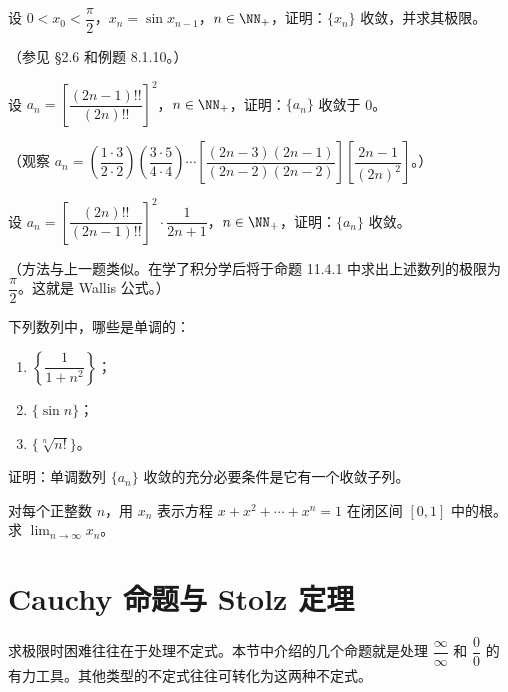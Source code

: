\begin{xexercise}[7]
设 $0<x_0<\dfrac\pi2$，$x_n=\sin x_{n-1}$，$n\in\NN_+$，证明：$\{x_n\}$ 收敛，并求其极限。

  （参见 §2.6 和例题 8.1.10。）
\end{xexercise}

\begin{xexercise}[8]
设 $a_n=\left[\dfrac{(2n-1)!!}{(2n)!!}\right]^2$，$n\in\NN_+$，证明：$\{a_n\}$ 收敛于 0。

  （观察 $a_n=\left(\dfrac{1\cdot3}{2\cdot2}\right)\left(\dfrac{3\cdot5}{4\cdot4}\right)\cdots\left[\dfrac{(2n-3)(2n-1)}{(2n-2)(2n-2)}\right]\left[\dfrac{2n-1}{(2n)^2}\right]$。）
\end{xexercise}

\begin{xexercise}[9]
设 $a_n=\left[\dfrac{(2n)!!}{(2n-1)!!}\right]^2\cdot\dfrac1{2n+1}$，$n\in\NN_+$，证明：$\{a_n\}$ 收敛。

  （方法与上一题类似。在学了积分学后将于命题 11.4.1 中求出上述数列的极限为 $\dfrac\pi2$。这就是 Wallis 公式。）
\end{xexercise}

\begin{xexercise}[10]
下列数列中，哪些是单调的：
  \begin{enumerate}[label=(\arabic*)]
    \item $\left\{\dfrac1{1+n^2}\right\}$；
    \item $\{\sin n\}$；
    \item $\{\sqrt[n]{n!}\}$。
  \end{enumerate}
\end{xexercise}

\begin{xexercise}[11]
证明：单调数列 $\{a_n\}$ 收敛的充分必要条件是它有一个收敛子列。
\end{xexercise}

\begin{xexercise}[12]
对每个正整数 $n$，用 $x_n$ 表示方程 $x+x^2+\cdots+x^n=1$ 在闭区间 $[0,1]$ 中的根。求 $\displaystyle\lim_{n\to\infty}x_n$。
\end{xexercise}

\section{Cauchy 命题与 Stolz 定理}

求极限时困难往往在于处理不定式。本节中介绍的几个命题就是处理 $\dfrac\infty\infty$ 和 $\dfrac00$ 的有力工具。其他类型的不定式往往可转化为这两种不定式。

